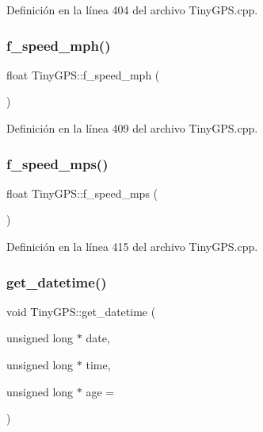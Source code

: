 Definición en la línea 404 del archivo Tiny\+G\+P\+S.\+cpp.

\mbox{\label{class_tiny_g_p_s_a7c3c51c4df168ef2b1583a86d8deff34}} 
\subsubsection{\texorpdfstring{f\+\_\+speed\+\_\+mph()}{f\_speed\_mph()}}
{\footnotesize\ttfamily float Tiny\+G\+P\+S\+::f\+\_\+speed\+\_\+mph (\begin{DoxyParamCaption}{ }\end{DoxyParamCaption})}



Definición en la línea 409 del archivo Tiny\+G\+P\+S.\+cpp.

\mbox{\label{class_tiny_g_p_s_a50bf6df367912942e294de13170cb1e0}} 
\subsubsection{\texorpdfstring{f\+\_\+speed\+\_\+mps()}{f\_speed\_mps()}}
{\footnotesize\ttfamily float Tiny\+G\+P\+S\+::f\+\_\+speed\+\_\+mps (\begin{DoxyParamCaption}{ }\end{DoxyParamCaption})}



Definición en la línea 415 del archivo Tiny\+G\+P\+S.\+cpp.

\mbox{\label{class_tiny_g_p_s_a08a6109f024623c7b5693c344e77e177}} 
\subsubsection{\texorpdfstring{get\+\_\+datetime()}{get\_datetime()}}
{\footnotesize\ttfamily void Tiny\+G\+P\+S\+::get\+\_\+datetime (\begin{DoxyParamCaption}\item[{unsigned long $\ast$}]{date,  }\item[{unsigned long $\ast$}]{time,  }\item[{unsigned long $\ast$}]{age = {} }\end{DoxyParamCaption})}



